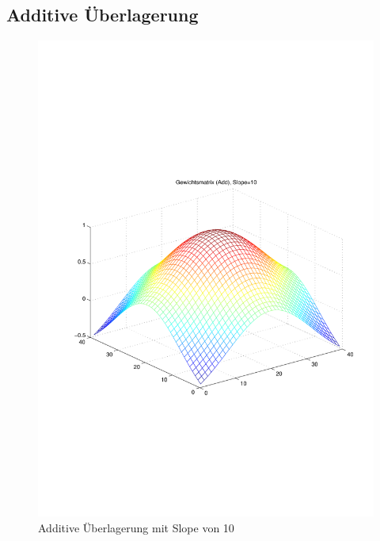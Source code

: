 \newpage
\subsection{Additive Überlagerung}
\begin{figure}[hbt]
	\begin{minipage}{0.5 \textwidth}
		\includegraphics[width=\textwidth]{./Bilder/Auswertung/Gewichtsmatrix/Gewichtsmatrix_Add_Slope_10}
		\caption{Additive Überlagerung mit Slope von 10}
		\label{Add10}
	\end{minipage}
	\hfill
	\begin{minipage}{0.5 \textwidth}

\end{minipage}
\end{figure}
